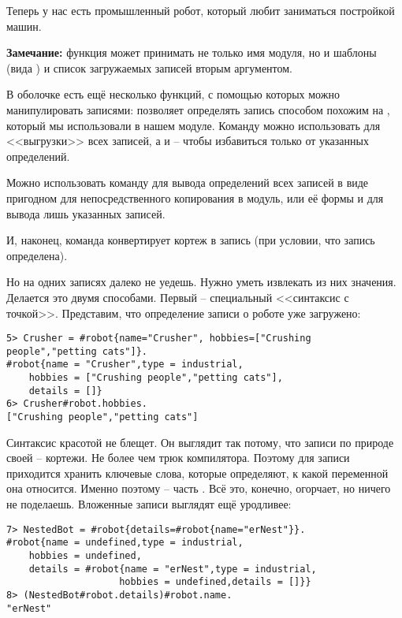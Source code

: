 Теперь у нас есть промышленный робот, который любит заниматься постройкой машин.\\
\colorbox{lgray}
{
\begin{minipage}{1.0\linewidth}
    \textbf{Замечание:}  функция  может принимать не только имя модуля, но и шаблоны (вида ) и список загружаемых записей вторым аргументом.

    В оболочке есть ещё несколько функций, с помощью которых можно манипулировать записями:  позволяет определять запись способом похожим на , который мы использовали в нашем модуле.
    Команду  можно использовать для <<выгрузки>> всех записей, а  и  \--- чтобы избавиться только от указанных определений.

    Можно использовать команду  для вывода определений всех записей в виде пригодном для непосредственного копирования в модуль, или её формы  и  для вывода лишь указанных записей.

    И, наконец, команда  конвертирует кортеж в запись (при условии, что запись определена).
\end{minipage}
}

Но на одних записях далеко не уедешь.
Нужно уметь извлекать из них значения.
Делается это двумя способами.
Первый \--- специальный <<синтаксис с точкой>>.
Представим, что определение записи о роботе уже загружено:
\begin{lstlisting}[style=erlang]
5> Crusher = #robot{name="Crusher", hobbies=["Crushing people","petting cats"]}.
#robot{name = "Crusher",type = industrial,
    hobbies = ["Crushing people","petting cats"],
    details = []}
6> Crusher#robot.hobbies.
["Crushing people","petting cats"]
\end{lstlisting}

Синтаксис красотой не блещет.
Он выглядит так потому, что записи по природе своей \--- кортежи.
Не более чем трюк компилятора.
Поэтому для записи приходится хранить ключевые слова, которые определяют, к какой переменной она относится. Именно поэтому  \--- часть .
Всё это, конечно, огорчает, но ничего не поделаешь.
Вложенные записи выглядят ещё уродливее:
\begin{lstlisting}[style=erlang]
7> NestedBot = #robot{details=#robot{name="erNest"}}.
#robot{name = undefined,type = industrial,
    hobbies = undefined,
    details = #robot{name = "erNest",type = industrial,
                    hobbies = undefined,details = []}}
8> (NestedBot#robot.details)#robot.name.
"erNest"
\end{lstlisting}

